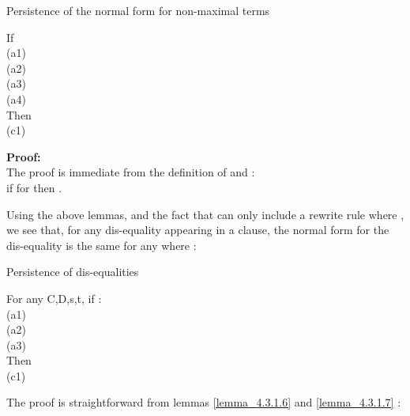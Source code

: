 \begin{lemma}{Persistence of the normal form for non-maximal terms}
\label{lemma_4.3.1.7}

\noindent
If\\
(a1) \\
(a2) \\
(a3) \\
(a4) \\
Then\\
(c1) 

\noindent
\textbf{Proof:}\\
The proof is immediate from the definition of  and :\\
if  for  then .
\end{lemma}

\noindent
Using the above lemmas, and the fact that  can only include a rewrite rule  
where , we see that, for any dis-equality appearing in a clause, 
the normal form for the dis-equality is the same for any  where :
\begin{lemma}{Persistence of dis-equalities}
\label{lemma_4.3.1.8}

\noindent
For any C,D,s,t, if :\\
(a1) \\
(a2) \\
(a3) \\
Then\\
(c1) 

\noindent
The proof is straightforward from lemmas \ref{lemma_4.3.1.6} and \ref{lemma_4.3.1.7} :\\
\end{lemma}

